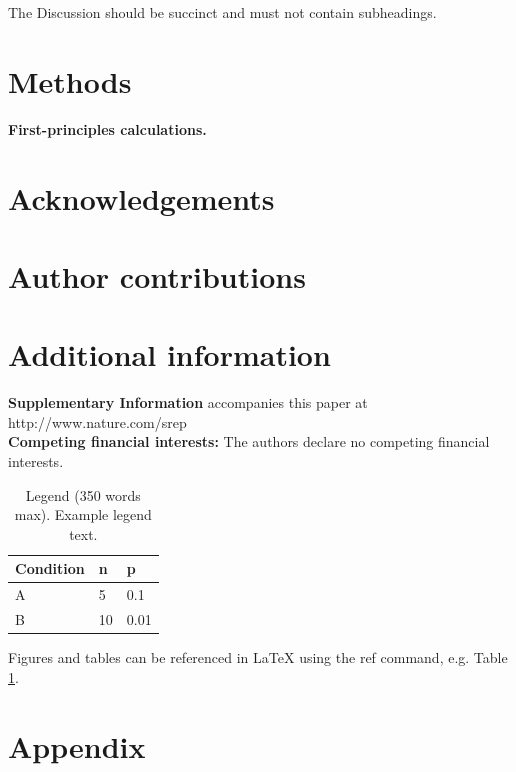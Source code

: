 \documentclass[fleqn,10pt]{wlscirep}
\begin{document}
The Discussion should be succinct and must not contain subheadings.

\section*{Methods}
\textbf{First-principles calculations.}

%


\section*{Acknowledgements}



\section*{Author contributions}


\section*{Additional information}

\textbf{Supplementary Information} accompanies this paper at http://www.nature.com/srep \\
\newline
\textbf{Competing financial interests:} The authors declare no competing financial interests.



\begin{table}[ht]
\centering
\begin{tabular}{|l|l|l|}
\hline
Condition & n & p \\
\hline
A & 5 & 0.1 \\
\hline
B & 10 & 0.01 \\
\hline
\end{tabular}
\caption{\label{tab:example}Legend (350 words max). Example legend text.}
\end{table}

Figures and tables can be referenced in LaTeX using the ref command, e.g. Table \ref{tab:example}.

\section{Appendix}
\end{document}
